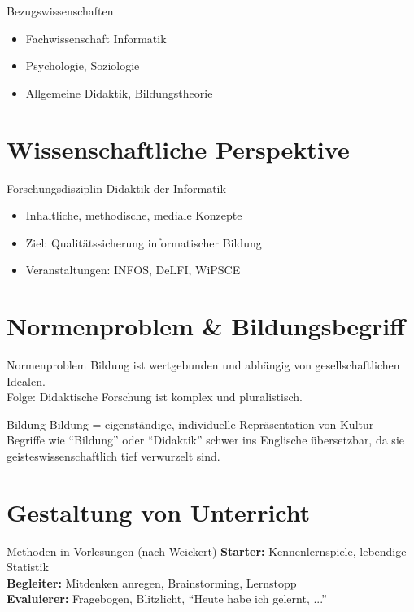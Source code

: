 \documentclass{article}
\begin{document}
\begin{block}{Bezugswissenschaften}
    \begin{itemize}
        \item Fachwissenschaft Informatik
        \item Psychologie, Soziologie
        \item Allgemeine Didaktik, Bildungstheorie
    \end{itemize}
\end{block}

\section{Wissenschaftliche Perspektive}
\begin{block}{Forschungsdisziplin Didaktik der Informatik}
    \begin{itemize}
        \item Inhaltliche, methodische, mediale Konzepte
        \item Ziel: Qualitätssicherung informatischer Bildung
        \item Veranstaltungen: INFOS, DeLFI, WiPSCE
    \end{itemize}
\end{block}

\section{Normenproblem \& Bildungsbegriff}
\begin{block}{Normenproblem}
    Bildung ist wertgebunden und abhängig von gesellschaftlichen Idealen.\\
    Folge: Didaktische Forschung ist komplex und pluralistisch.
\end{block}

\begin{block}{Bildung}
    Bildung = eigenständige, individuelle Repräsentation von Kultur \\
    Begriffe wie ``Bildung'' oder ``Didaktik'' schwer ins Englische übersetzbar, da sie geisteswissenschaftlich tief verwurzelt sind.
\end{block}

\section{Gestaltung von Unterricht}
\begin{block}{Methoden in Vorlesungen (nach Weickert)}
    \textbf{Starter:} Kennenlernspiele, lebendige Statistik \\
    \textbf{Begleiter:} Mitdenken anregen, Brainstorming, Lernstopp \\
    \textbf{Evaluierer:} Fragebogen, Blitzlicht, ``Heute habe ich gelernt, ...''
\end{block}
\end{document}
